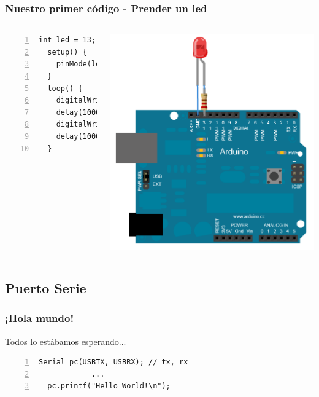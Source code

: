 \documentclass[compress]{beamer}
\begin{document}
\begin{frame}[fragile]
\frametitle{Nuestro primer código - Prender un led}

\begin{columns}
  \begin{Verbatim}[formatcom=\color{red},fontseries=b, numbers=left,numbersep=3pt]
  int led = 13;
  setup() {
    pinMode(led, OUTPUT);
  }
  loop() {
    digitalWrite(led, HIGH);
    delay(1000);
    digitalWrite(led, LOW);
    delay(1000);
  }
  \end{Verbatim} 

   \includegraphics[width=\columnwidth]{./img/arduino_led.png}

\end{columns}
\end{frame}

\subsection{Puerto Serie}
\begin{frame}[fragile]
 \frametitle{¡Hola mundo!}
Todos lo estábamos esperando...
\begin{Verbatim}[formatcom=\color{red},fontseries=b, numbers=left,numbersep=3pt]
  Serial pc(USBTX, USBRX); // tx, rx
            ...
  pc.printf("Hello World!\n"); 
\end{Verbatim}
\begin{center}
\end{center}
\end{frame}
\end{document}
